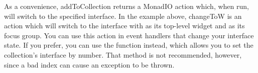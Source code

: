 As a convenience, addToCollection returns a MonadIO action which, when
run, will switch to the specified interface.  In the example above,
changeToW is an action which will switch to the interface with 
as its top-level widget and  as its focus group.  You can use
this action in event handlers that change your interface state.  If
you prefer, you can use the  function instead,
which allows you to set the collection's interface by number.  That
method is not recommended, however, since a bad index can cause an
exception to be thrown.
